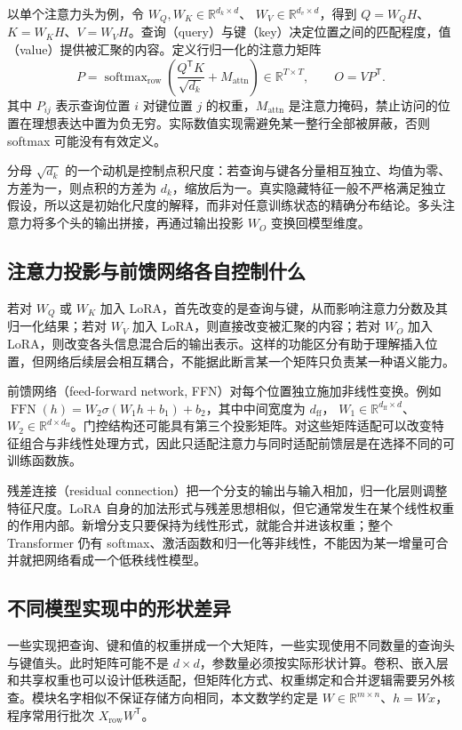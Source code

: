 \documentclass[UTF8,12pt,a4paper,fontset=fandol]{ctexart}
\begin{document}
以单个注意力头为例，令
$W_Q,W_K\in\mathbb R^{d_k\times d}$、
$W_V\in\mathbb R^{d_v\times d}$，得到
$Q=W_QH$、$K=W_KH$、$V=W_VH$。查询（query）与键（key）决定位置之间的匹配程度，值（value）提供被汇聚的内容。定义行归一化的注意力矩阵
\[
P=\operatorname{softmax}_{\mathrm{row}}
\left(\frac{Q^{\mathsf T}K}{\sqrt{d_k}}+M_{\mathrm{attn}}\right)
\in\mathbb R^{T\times T},
\qquad O=VP^{\mathsf T}.
\]
其中 $P_{ij}$ 表示查询位置 $i$ 对键位置 $j$ 的权重，$M_{\mathrm{attn}}$ 是注意力掩码，禁止访问的位置在理想表达中置为负无穷。实际数值实现需避免某一整行全部被屏蔽，否则 softmax 可能没有有效定义。

分母 $\sqrt{d_k}$ 的一个动机是控制点积尺度：若查询与键各分量相互独立、均值为零、方差为一，则点积的方差为 $d_k$，缩放后为一。真实隐藏特征一般不严格满足独立假设，所以这是初始化尺度的解释，而非对任意训练状态的精确分布结论。多头注意力将多个头的输出拼接，再通过输出投影 $W_O$ 变换回模型维度。

\subsection{注意力投影与前馈网络各自控制什么}

若对 $W_Q$ 或 $W_K$ 加入 LoRA，首先改变的是查询与键，从而影响注意力分数及其归一化结果；若对 $W_V$ 加入 LoRA，则直接改变被汇聚的内容；若对 $W_O$ 加入 LoRA，则改变各头信息混合后的输出表示。这样的功能区分有助于理解插入位置，但网络后续层会相互耦合，不能据此断言某一个矩阵只负责某一种语义能力。

前馈网络（feed-forward network, FFN）对每个位置独立施加非线性变换。例如
$\operatorname{FFN}(h)=W_2\sigma(W_1h+b_1)+b_2$，其中中间宽度为 $d_{\mathrm{ff}}$，
$W_1\in\mathbb R^{d_{\mathrm{ff}}\times d}$、
$W_2\in\mathbb R^{d\times d_{\mathrm{ff}}}$。门控结构还可能具有第三个投影矩阵。对这些矩阵适配可以改变特征组合与非线性处理方式，因此只适配注意力与同时适配前馈层是在选择不同的可训练函数族。

残差连接（residual connection）把一个分支的输出与输入相加，归一化层则调整特征尺度。LoRA 自身的加法形式与残差思想相似，但它通常发生在某个线性权重的作用内部。新增分支只要保持为线性形式，就能合并进该权重；整个 Transformer 仍有 softmax、激活函数和归一化等非线性，不能因为某一增量可合并就把网络看成一个低秩线性模型。

\subsection{不同模型实现中的形状差异}

一些实现把查询、键和值的权重拼成一个大矩阵，一些实现使用不同数量的查询头与键值头。此时矩阵可能不是 $d\times d$，参数量必须按实际形状计算。卷积、嵌入层和共享权重也可以设计低秩适配，但矩阵化方式、权重绑定和合并逻辑需要另外核查。模块名字相似不保证存储方向相同，本文数学约定是 $W\in\mathbb R^{m\times n}$、$h=Wx$，程序常用行批次 $X_{\mathrm{row}}W^{\mathsf T}$。
\end{document}
